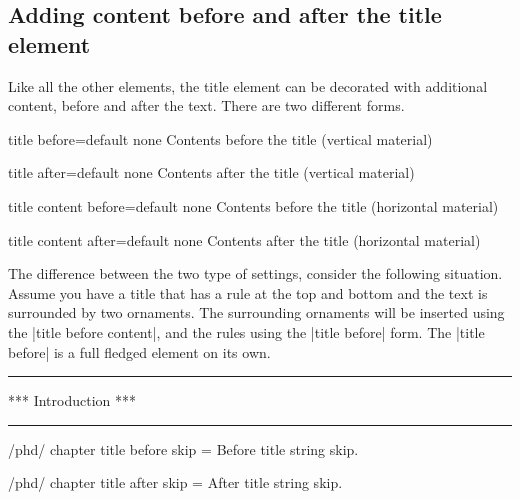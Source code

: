 \subsection{Adding content before and after the title element}

Like all the other elements, the title element can be decorated with additional content,
before and after the text. There are two different forms. 

\begin{docKey}[phd]{title before}{=}{default none}
Contents before the title (vertical material)
\end{docKey}

\begin{docKey}[phd]{title after}{=}{default none}
Contents after the title (vertical material)
\end{docKey}

\begin{docKey}[phd]{title content before}{=}{default none}
Contents before the title (horizontal material)
\end{docKey}

\begin{docKey}[phd]{title content after}{=}{default none}
Contents after the title (horizontal material)
\end{docKey}

The difference between the two type of settings, consider the following situation. Assume you have a title that has a rule at the top and bottom and the text is surrounded by two ornaments. The surrounding ornaments will be inserted using the |title before content|, and the rules using the |title before| form. The |title before| is a full fledged element on its own. 

{
\hrule
\centering
*** Introduction ***
\par
\hrule
}

{
\MakePercentComment
{}

\MakePercentIgnore
}



 
\begin{key}{/phd/ chapter title before skip = }
Before title string skip.
\end{key}
  \begin{key}{/phd/ chapter title after skip = }
After title string skip.
\end{key}

\lorem 
%
%
%         
%
%




